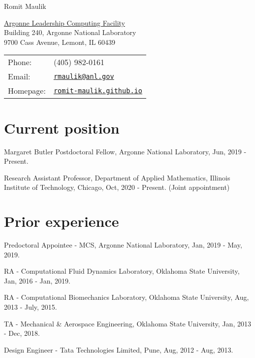 \documentclass[letterpaper]{article}
\def\name{Romit Maulik}
\renewenvironment{itemize}{
  \begin{list}{}{
    \setlength{\leftmargin}{1.5em}
  }
}{
  \end{list}
}
\begin{document}
{\huge \name}


\vspace{0.25in}

\begin{minipage}{0.45\linewidth}
  \href{http://www.mcs.anl.gov/}{Argonne Leadership Computing Facility} \\
  Building 240, Argonne National Laboratory \\
  9700 Cass Avenue, Lemont, IL 60439
\end{minipage}
\begin{minipage}{0.45\linewidth}
  \begin{tabular}{ll}
    Phone: & (405) 982-0161 \\
    Email: & \href{mailto:rmaulik@anl.gov}{\tt rmaulik@anl.gov} \\
    Homepage: & \href{https://romit-maulik.github.io/}{\tt romit-maulik.github.io} \\
  \end{tabular}
\end{minipage}


\section*{Current position}
\begin{itemize}
\item Margaret Butler Postdoctoral Fellow, Argonne National Laboratory, Jun, 2019 - Present.
\item Research Assistant Professor, Department of Applied Mathematics, Illinois Institute of Technology, Chicago, Oct, 2020 - Present. (Joint appointment)
\end{itemize}

\section*{Prior experience}

\begin{itemize}
\item Predoctoral Appointee - MCS, Argonne National Laboratory, Jan, 2019 - May, 2019.
\item RA - Computational Fluid Dynamics Laboratory, Oklahoma State University, Jan, 2016 - Jan, 2019.
\item RA - Computational Biomechanics Laboratory, Oklahoma State University, Aug, 2013 - July, 2015.
\item TA - Mechanical \& Aerospace Engineering, Oklahoma State University, Jan, 2013 - Dec, 2018.
\item Design Engineer - Tata Technologies Limited, Pune, Aug, 2012 - Aug, 2013.
\end{itemize}
\end{document}
